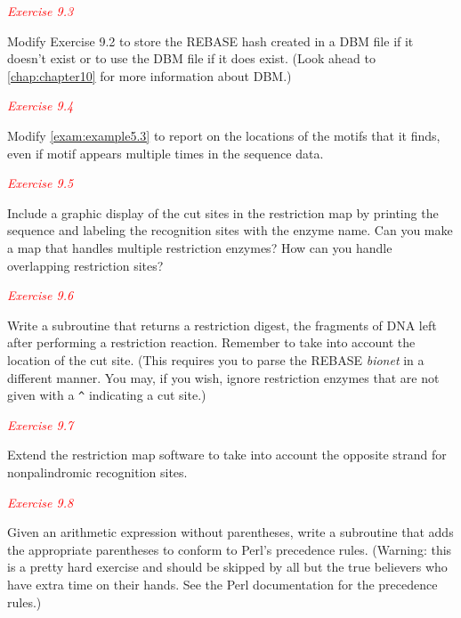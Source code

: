 \textcolor{red}{\textit{Exercise 9.3}}
\begin{adjustwidth}{1cm}{}
Modify Exercise 9.2 to store the REBASE hash created in a DBM file if it doesn't exist or to use the DBM file if it does exist. (Look ahead to \autoref{chap:chapter10} for more information about DBM.) 
\end{adjustwidth}

\textcolor{red}{\textit{Exercise 9.4}}
\begin{adjustwidth}{1cm}{}
Modify \autoref{exam:example5.3} to report on the locations of the motifs that it finds, even if motif appears multiple times in the sequence data. 
\end{adjustwidth}

\textcolor{red}{\textit{Exercise 9.5}}
\begin{adjustwidth}{1cm}{}
Include a graphic display of the cut sites in the restriction map by printing the sequence and labeling the recognition sites with the enzyme name. Can you make a map that handles multiple restriction enzymes? How can you handle overlapping restriction sites? 
\end{adjustwidth}

\textcolor{red}{\textit{Exercise 9.6}}
\begin{adjustwidth}{1cm}{}
Write a subroutine that returns a restriction digest, the fragments of DNA left after performing a restriction reaction. Remember to take into account the location of the cut site. (This requires you to parse the REBASE \textit{bionet} in a different manner. You may, if you wish, ignore restriction enzymes that are not given with a \verb|^| indicating a cut site.) 
\end{adjustwidth}


\textcolor{red}{\textit{Exercise 9.7}}
\begin{adjustwidth}{1cm}{}
Extend the restriction map software to take into account the opposite strand for nonpalindromic recognition sites. 
\end{adjustwidth}

\textcolor{red}{\textit{Exercise 9.8}}
\begin{adjustwidth}{1cm}{}
Given an arithmetic expression without parentheses, write a subroutine that adds the appropriate parentheses to conform to Perl's precedence rules. (Warning: this is a pretty hard exercise and should be skipped by all but the true believers who have extra time on their hands. See the Perl documentation for the precedence rules.) 
\end{adjustwidth}

